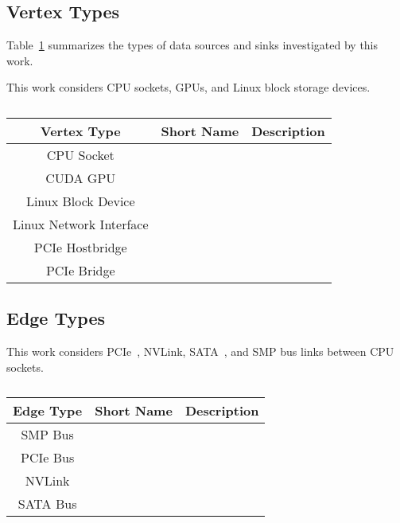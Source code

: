 \subsection{Vertex Types}
\label{sec:system-vertices}

Table~\ref{tab:topology-vertices} summarizes the types of data sources and sinks investigated by this work.

This work considers CPU sockets, GPUs, and Linux block storage devices.

\begin{table}[]
    \centering
    \caption[Discoverable vertex types]{}
    \label{tab:topology-vertices}
    \begin{tabular}{|c|c|c|}
    \hline
    \textbf{Vertex Type}    & \textbf{Short Name} & \textbf{Description} \\ \hline
    CPU Socket              &                     &                      \\ \hline
    CUDA GPU                &                     &                      \\ \hline
    Linux Block Device      &                     &                      \\ \hline
    Linux Network Interface &                     &                      \\ \hline
    PCIe Hostbridge         &                     &                      \\ \hline
    PCIe Bridge             &                     &                      \\ \hline
    \end{tabular}
\end{table}

\subsection{Edge Types}
\label{sec:system-edges}

This work considers PCIe~, NVLink\cite{nvidia2017nvlink}, SATA~, and SMP bus links between CPU sockets.

\begin{table}[]
    \centering
    \caption[Discoverable edge types]{}
    \label{tab:topology-edges}
    \begin{tabular}{|c|c|c|}
    \hline
    \textbf{Edge Type} & \textbf{Short Name} & \textbf{Description} \\ \hline
    SMP Bus            &                     &                      \\ \hline
    PCIe Bus           &                     &                      \\ \hline
    NVLink             &                     &                      \\ \hline
    SATA Bus           &                     &                      \\ \hline
    \end{tabular}
\end{table}



